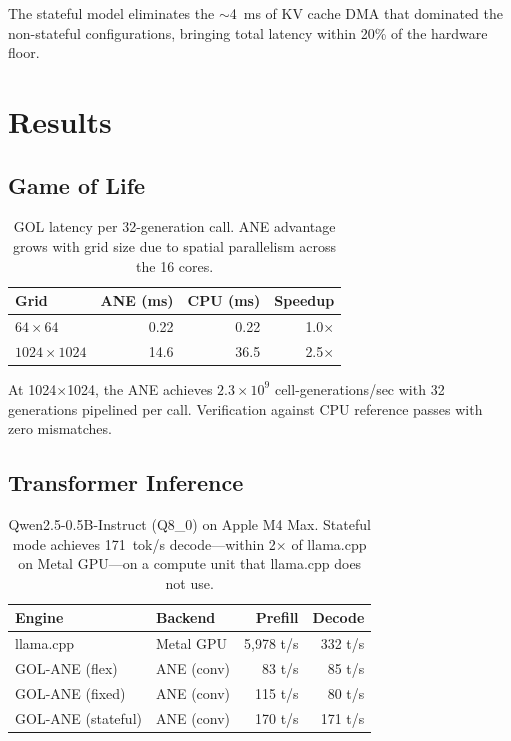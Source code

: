 \documentclass[11pt,twocolumn]{article}
\begin{document}
The stateful model eliminates the $\sim$4~ms of KV cache DMA that
dominated the non-stateful configurations, bringing total latency
within 20\% of the hardware floor.


\section{Results}
\label{sec:results}

\subsection{Game of Life}

\begin{table}[t]
\centering
\footnotesize
\begin{tabular}{lrrr}
\toprule
\textbf{Grid} & \textbf{ANE (ms)} & \textbf{CPU (ms)} & \textbf{Speedup} \\
\midrule
$64 \times 64$ & 0.22 & 0.22 & 1.0$\times$ \\
$1024 \times 1024$ & 14.6 & 36.5 & 2.5$\times$ \\
\bottomrule
\end{tabular}
\caption{GOL latency per 32-generation call. ANE advantage grows with
grid size due to spatial parallelism across the 16 cores.}
\label{tab:gol}
\end{table}

At 1024$\times$1024, the ANE achieves $2.3 \times 10^9$
cell-generations/sec with 32 generations pipelined per call.
Verification against CPU reference passes with zero mismatches.

\subsection{Transformer Inference}

\begin{table}[t]
\centering
\footnotesize
\begin{tabular}{llrr}
\toprule
\textbf{Engine} & \textbf{Backend} & \textbf{Prefill} & \textbf{Decode} \\
\midrule
llama.cpp & Metal GPU & 5,978 t/s & 332 t/s \\
GOL-ANE (flex) & ANE (conv) & 83 t/s & 85 t/s \\
GOL-ANE (fixed) & ANE (conv) & 115 t/s & 80 t/s \\
GOL-ANE (stateful) & ANE (conv) & 170 t/s & 171 t/s \\
\bottomrule
\end{tabular}
\caption{Qwen2.5-0.5B-Instruct (Q8\_0) on Apple M4 Max. Stateful mode
achieves 171~tok/s decode---within 2$\times$ of llama.cpp on Metal
GPU---on a compute unit that llama.cpp does not use.}
\label{tab:transformer}
\end{table}
\end{document}
